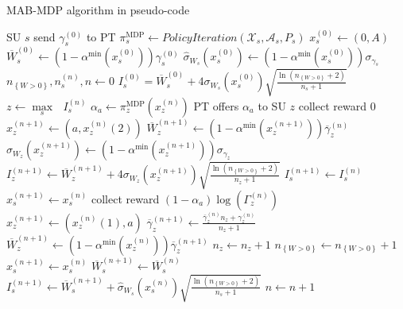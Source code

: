 \begin{algorithm}
\caption{MAB-MDP algorithm in pseudo-code}
\label{code:TLP}
\begin{algorithmic}
    \STATE SU $s$ send $\gamma_s^{(0)}$ to PT
    \STATE $\pi_s^{\text{MDP}} \leftarrow Policy Iteration(\mathcal{X}_s,\mathcal{A}_s,P_s)$
    \STATE $x_s^{(0)} \leftarrow (0,A)$
    \STATE $\overline{W}_s^{(0)}\leftarrow (1-\alpha^{\text{min}}(x_s^{(0)}))\gamma_s^{(0)}$ 
    \STATE $\hat\sigma_{W_s}(x_s^{(0)}) \leftarrow (1-\alpha^{\text{min}}(x_s^{(0)}))\sigma_{\gamma_s}$
    \STATE $n_{\left\{W>0\right\}}, n_s^{(n)}, n \leftarrow 0$
    \STATE $I_{s}^{(0)} = \overline{W}^{(0)}_s + 4 \sigma_{W_{s}}(x_s^{(0)})\sqrt{\frac{\ln(n_{\left\{W>0\right\}} + 2)}{n_s+1}}$
  \ENDFOR
  \LOOP
    \STATE $z \leftarrow \underset{s}\max\text{ }I_s^{(n)}$
    \STATE $\alpha_a \leftarrow \pi_z^{\text{MDP}}(x_z^{(n)})$
    \STATE PT offers $\alpha_a$ to SU $z$
      \STATE collect reward  $0$
      \STATE $x_z^{(n+1)} \leftarrow (a,x_z^{(n)}(2))$ 
      \STATE $\overline{W}_z^{(n+1)}\leftarrow (1-\alpha^{\text{min}}(x_z^{(n+1)}))\overline{\gamma}_z^{(n)}$
      \STATE $\hat\sigma_{W_z}(x_z^{(n+1)}) \leftarrow (1-\alpha^{\text{min}}(x_z^{(n+1)}))\sigma_{\gamma_z}$
      \STATE $I_{z}^{(n+1)} \leftarrow \overline{W}_z^{(n+1)} + 4\sigma_{W_z}(x_z^{(n+1)}) \sqrt{\frac{\ln(n_{\left\{W>0\right\}} + 2)}{n_z+1}}$ 
        \STATE $I_{s}^{(n+1)} \leftarrow I_{s}^{(n)}$
        \STATE $x_s^{(n+1)} \leftarrow x_s^{(n)}$
      \ENDFOR
    \ELSE
      \STATE collect reward $(1-\alpha_a)\log(\Gamma_z^{(n)})$
      \STATE $x_z^{(n+1)} \leftarrow (x_z^{(n)}(1),a)$
      \STATE $\overline{\gamma}_{z}^{(n+1)} \leftarrow \frac{\overline{\gamma}_{z}^{(n)}n_z+\gamma_z^{(n)}}{n_z+1}$  
      \STATE $\overline{W}_z^{(n+1)}\leftarrow (1-\alpha^{\text{min}}(x_z^{(n)}))\overline{\gamma}_z^{(n+1)}$
      \STATE $n_z \leftarrow n_z + 1$
      \STATE $n_{\left\{W>0\right\}} \leftarrow n_{\left\{W>0\right\}} + 1$
          \STATE $x_s^{(n+1)} \leftarrow x_s^{(n)}$
          \STATE $\overline{W}_s^{(n+1)}\leftarrow \overline{W}_s^{(n)}$
        \ENDIF
        \STATE $I_{s}^{(n+1)} \leftarrow \overline{W}_{s}^{(n+1)} + \hat\sigma_{W_s}(x_s^{(n)}) \sqrt{\frac{\ln(n_{\left\{W>0\right\}} + 2)}{n_s+1}}$
      \ENDFOR
    \ENDIF
    \STATE $n \leftarrow n + 1$
  \ENDLOOP
\end{algorithmic}
\end{algorithm}
